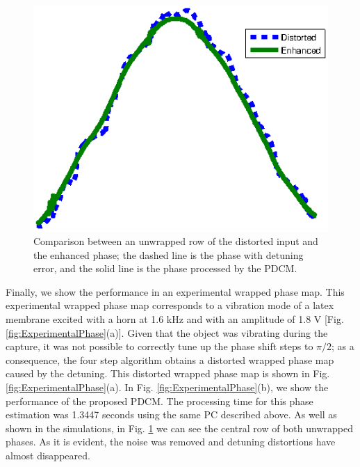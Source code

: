 \begin{figure}[Ht!]
  \begin{center}
      \includegraphics[scale=0.6]{Chpt4_figures/fig_E3.eps}
  \end{center}
  \caption{Comparison between an unwrapped 
    row of the distorted input and the enhanced phase; the dashed line is 
    the phase with detuning error, and the solid line is the phase processed 
    by the PDCM.}
  \label{fig:ExperimentalPhasetemp}
\end{figure}

Finally, we show the performance in an experimental wrapped phase map. This
experimental wrapped phase map corresponds to a vibration mode of a latex
membrane excited with a horn at 1.6 kHz and with an amplitude of 1.8 V [Fig.
\ref{fig:ExperimentalPhase}(a)]. Given that the object was vibrating 
during the capture, it was not possible to correctly tune up the phase 
shift steps to $\pi/2$; as a consequence, the four step algorithm obtains 
a distorted wrapped phase map caused by the detuning. This distorted wrapped 
phase map is shown in Fig. \ref{fig:ExperimentalPhase}(a). In Fig. 
\ref{fig:ExperimentalPhase}(b), we show the performance of the proposed 
PDCM. The processing time for this phase estimation was 1.3447 seconds using
the same PC described above. As well as shown in the simulations, in Fig. 
\ref{fig:ExperimentalPhasetemp} we can see the central row of both 
unwrapped phases. As it is evident, the noise was removed and
detuning distortions have almost disappeared.

